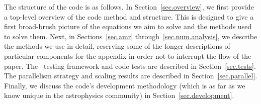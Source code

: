 The structure of the code is as follows.  In Section~\ref{sec.overview}, we first provide a top-level overview of the code method and structure.  This is designed to give a first broad-brush picture of the equations we aim to solve and the methods used to solve them.  Next, in Sections~\ref{sec.amr} through~\ref{sec.num.analysis}, we describe the methods we use in detail, reserving some of the longer descriptions of particular components for the appendix in order not to interrupt the flow of the paper.  The \enzo\ testing framework and code tests are described in Section~\ref{sec.tests}.  The parallelism strategy and scaling results are described in Section~\ref{sec.parallel}.  Finally, we discuss the code's development methodology (which is as far as we know unique in the astrophysics community) in Section~\ref{sec.development}.

